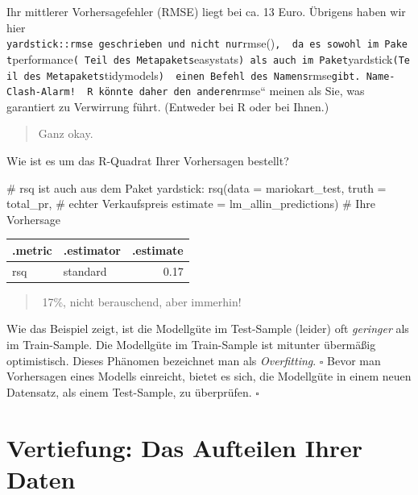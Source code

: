 \documentclass[
  letterpaper,
  oneside,
  open=any]{scrbook}
\newenvironment{Shaded}{\begin{snugshade}}{\end{snugshade}}
\newcommand{\AttributeTok}[1]{\textcolor[rgb]{0.40,0.45,0.13}{#1}}
\newcommand{\CommentTok}[1]{\textcolor[rgb]{0.37,0.37,0.37}{#1}}
\newcommand{\FunctionTok}[1]{\textcolor[rgb]{0.28,0.35,0.67}{#1}}
\newcommand{\NormalTok}[1]{\textcolor[rgb]{0.00,0.23,0.31}{#1}}
\theoremstyle{definition}
\theoremstyle{definition}
\theoremstyle{definition}
\theoremstyle{remark}
\begin{document}
Ihr mittlerer Vorhersagefehler (RMSE) liegt bei ca. 13 Euro. Übrigens
haben wir hier
\texttt{yardstick::rmse\ geschrieben\ und\ nicht\ nur}rmse()\texttt{,\ \ da\ es\ sowohl\ im\ Paket}performance\texttt{(\ Teil\ des\ Metapakets}easystats\texttt{)\ als\ auch\ im\ Paket}yardstick\texttt{(Teil\ des\ Metapakets}tidymodels\texttt{)\ \ einen\ Befehl\ des\ Namens}rmse\texttt{gibt.\ Name-Clash-Alarm!\ \ R\ könnte\ daher\ den\ anderen}rmse``
meinen als Sie, was garantiert zu Verwirrung führt. (Entweder bei R oder
bei Ihnen.)

\begin{quote}
{} Ganz okay.
\end{quote}

Wie ist es um das R-Quadrat Ihrer Vorhersagen bestellt?

\begin{Shaded}
\begin{Highlighting}[]
\CommentTok{\# \textasciigrave{}rsq \textasciigrave{} ist auch aus dem Paket yardstick:}
\FunctionTok{rsq}\NormalTok{(}\AttributeTok{data =}\NormalTok{ mariokart\_test,}
    \AttributeTok{truth =}\NormalTok{ total\_pr,  }\CommentTok{\# echter Verkaufspreis}
    \AttributeTok{estimate =}\NormalTok{ lm\_allin\_predictions)  }\CommentTok{\# Ihre Vorhersage}
\end{Highlighting}
\end{Shaded}

\begin{longtable}[]{@{}llr@{}}
\toprule\noalign{}
.metric & .estimator & .estimate \\
\midrule\noalign{}
\endhead
\bottomrule\noalign{}
\endlastfoot
rsq & standard & 0.17 \\
\end{longtable}

\begin{quote}
{}️ 17\%, nicht berauschend, aber immerhin!
\end{quote}

Wie das Beispiel zeigt, ist die Modellgüte im Test-Sample (leider) oft
\emph{geringer} als im Train-Sample. Die Modellgüte im Train-Sample ist
mitunter übermäßig optimistisch. Dieses Phänomen bezeichnet man als
\emph{Overfitting}. \(\square\) Bevor man Vorhersagen eines Modells
einreicht, bietet es sich, die Modellgüte in einem neuen Datensatz, als
einem Test-Sample, zu überprüfen. \(\square\)

\section{Vertiefung: Das Aufteilen Ihrer
Daten}\label{vertiefung-das-aufteilen-ihrer-daten}
\end{document}
